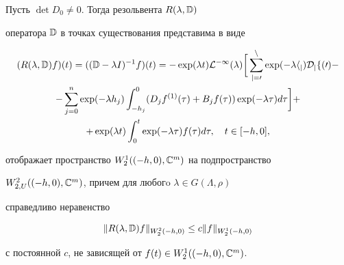 \begin{lem} 


Пусть $\det D_0\ne0$. Тогда резольвента $R(\lambda,\Bbb D)$ 


оператора $\Bbb D$ в точках существования представима в виде 


\begin{multline} 


(R(\lambda,\Bbb D)f)(t)=((\Bbb D-\lambda I)^{-1}f)(t)= 


-\exp(\lambda t)\cal L^{-1}(\lambda)\bigg[\sum^n_{j=0} 


\exp(-\lambda h_j)D_j f(0)- \\ 


% 


-\sum^n_{j=0}\exp(-\lambda h_j)\int^0_{-h_j}(D_j f^{(1)}(\tau)+ 


B_j f(\tau))\exp(-\lambda\tau)d\tau\bigg]+ \\ 


% 


+\exp(\lambda t)\int^t_0\exp(-\lambda\tau)f(\tau)d\tau,\quad 


t\in[-h,0], 


\end{multline} 


отображает пространство $W^{1}_{2}((-h,0),\Bbb C^m)$ на подпространство 


$W^{2}_{2,U}((-h,0),\Bbb C^m)$, причем для любогo $\lambda\in 


G(\Lambda,\rho)$ 


справедливо неравенство 


\begin{equation} 


\|R(\lambda,\Bbb D)f\|_{W^2_2(-h,0)}\le c\|f\|_{W^1_2(-h,0)} 


\end{equation} 


с постоянной $c$, не зависящей от $f(t)\in W^{1}_{2}((-h,0),\Bbb C^m)$. 


\end{lem} 


 


